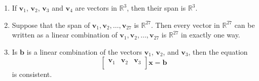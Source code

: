 \documentclass[12pt]{article}
\newcommand{\vs}[1]{\vspace{#1in}}
\newcommand{\bvec}{{\mathbf b}}
\newcommand{\vvec}{{\mathbf v}}
\newcommand{\xvec}{{\mathbf x}}
\newcommand{\real}{{\mathbb R}}
\begin{document}
\begin{enumerate}
  \begin{enumerate}[label=(\alph*)]
  \item If $\vvec_1$, $\vvec_2$, $\vvec_3$ and $\vvec_4$ are vectors
    in $\real^3$, then their span is $\real^3$.

    \vs{1}
  \item Suppose that the span of $\vvec_1,\vvec_2,\ldots,\vvec_{27}$
    is $\real^{27}$.  Then every vector in $\real^{27}$ can be written
    as a linear combination of $\vvec_1,\vvec_2,\ldots,\vvec_{27}$
    is $\real^{27}$ in exactly one way.

    \vs{1.5}
  \item Is $\bvec$ is a linear combination of the vectors $\vvec_1$,
    $\vvec_2$, and $\vvec_3$, then the equation
    $$
    \left[
      \begin{array}{ccc}
        \vvec_1 & \vvec_2 & \vvec_3 \\
      \end{array}
    \right]
    \xvec = \bvec
    $$
    is consistent.
  \end{enumerate}
  

  
    

  

\end{enumerate}
\end{document}
